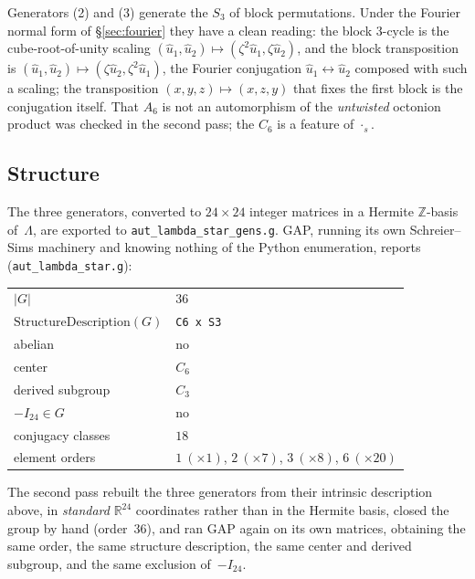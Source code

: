 \documentclass[11pt]{amsart}
\newcommand{\LL}{\Lambda}
\newcommand{\ZZ}{\mathbb{Z}}
\newcommand{\RR}{\mathbb{R}}
\theoremstyle{definition}
\theoremstyle{remark}
\begin{document}
Generators (2) and (3) generate the $S_3$ of block permutations. Under the
Fourier normal form of \S\ref{sec:fourier} they have a clean reading: the block
$3$-cycle is the cube-root-of-unity scaling
$(\hat u_1, \hat u_2) \mapsto (\zeta^2 \hat u_1, \zeta \hat u_2)$, and the block
transposition is $(\hat u_1, \hat u_2) \mapsto (\zeta \hat u_2, \zeta^2 \hat u_1)$, the
Fourier conjugation $\hat u_1 \leftrightarrow \hat u_2$ composed with such a scaling;
the transposition $(x,y,z) \mapsto (x,z,y)$ that fixes the first block is the
conjugation itself.
That $A_6$ is not an automorphism of the \emph{untwisted} octonion product was
checked in the second pass; the $C_6$ is a feature of $\cdot_s$.

\subsection{Structure}

The three generators, converted to $24 \times 24$ integer matrices in a Hermite
$\ZZ$-basis of~$\LL$, are exported to
\texttt{aut\_lambda\_star\_gens.g}. GAP, running its own
Schreier--Sims machinery and knowing nothing of the Python enumeration, reports
(\texttt{aut\_lambda\_star.g}):

\begin{center}
\begin{tabular}{ll}
\toprule
$|G|$ & $36$ \\
$\mathrm{StructureDescription}(G)$ & \texttt{C6 x S3} \\
abelian & no \\
center & $C_6$ \\
derived subgroup & $C_3$ \\
$-I_{24} \in G$ & no \\
conjugacy classes & $18$ \\
element orders & $1\ (\times 1)$, \; $2\ (\times 7)$, \;
                 $3\ (\times 8)$, \; $6\ (\times 20)$ \\
\bottomrule
\end{tabular}
\end{center}

The second pass rebuilt the three generators from their intrinsic description
above, in \emph{standard} $\RR^{24}$ coordinates rather than in the Hermite
basis, closed the group by hand (order~$36$), and ran GAP again on its own
matrices, obtaining the same order, the same structure description, the same
center and derived subgroup, and the same exclusion of~$-I_{24}$.
\end{document}
